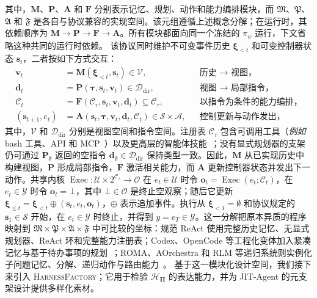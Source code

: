 \documentclass{article}
\newcommand{\ourmethod}{JIT-Agent\xspace}
\begin{document}
其中，$\mathbf{M}$、$\mathbf{P}$、$\mathbf{A}$ 和 $\mathbf{F}$ 分别表示记忆、规划、动作和能力编排模块，而 $\mathfrak{M}$、$\mathfrak{P}$、$\mathfrak{A}$ 和 $\mathfrak{F}$ 是各自与协议兼容的实现空间。该元组遵循上述概念分解；在运行时，其依赖顺序为 $\mathbf{M}\!\rightarrow\!\mathbf{P}\!\rightarrow\!\mathbf{F}\!\rightarrow\!\mathbf{A}$。所有模块都面向同一个冻结的 $\pi_{\psi}$ 运行，下文省略这种共同的运行时依赖。
该协议同时维护不可变事件历史 $\boldsymbol{\xi}_{<t}$ 和可变控制器状态 $\mathbf{s}_t$，二者按如下方式交互：
\begin{equation}
\label{eq:module_dynamics}
\begin{aligned}
    \mathbf{v}_t &= \mathbf{M}(\boldsymbol{\xi}_{<t},\mathbf{s}_t) \in \mathcal{V},
    && \text{历史 $\to$ 视图，} \\
    \mathbf{d}_t &= \mathbf{P}(\boldsymbol{\tau},\mathbf{s}_t,\mathbf{v}_t) \in \mathcal{D}_{\mathrm{dir}},
    && \text{视图 $\to$ 局部指令，} \\
    \mathcal{C}_t &= \mathbf{F}(\mathcal{C}_{\tau},\mathbf{s}_t,\mathbf{v}_t,\mathbf{d}_t) \subseteq \mathcal{C}_{\tau},
    && \text{以指令为条件的能力编排，} \\
    (\mathbf{s}_{t+1},e_t) &= \mathbf{A}(\mathbf{s}_t,\boldsymbol{\tau},\mathbf{v}_t,\mathbf{d}_t,\mathcal{C}_t) \in \mathcal{S}\times\mathcal{A},
    && \text{控制更新与动作发出，}
\end{aligned}
\end{equation}
其中，$\mathcal{V}$ 和 $\mathcal{D}_{\mathrm{dir}}$ 分别是视图空间和指令空间。注册表 $\mathcal{C}_{\tau}$ 包含可调用工具（\textit{例如} bash 工具、API 和 MCP~\citep{sarkar2025surveyllmagentcommunication}）以及更高层的智能体技能~\citep{xu2026agentskillslargelanguage,claudeAgentSkills}；没有显式规划器的支架仍可通过 $\mathbf{P}_{\emptyset}$ 返回的空指令 $\mathbf{d}_{\emptyset}\in\mathcal{D}_{\mathrm{dir}}$ 保持类型一致。因此，$\mathbf{M}$ 从已实现历史中构建视图，$\mathbf{P}$ 形成局部指令，$\mathbf{F}$ 激活相关能力，而 $\mathbf{A}$ 更新控制器状态并发出下一动作。共享内核 $\operatorname{Exec}:\mathcal{U}\times2^{\mathcal{C}_{\tau}}\rightarrow\mathcal{O}$ 在 $e_t\in\mathcal{U}$ 时令 $\mathbf{o}_t=\operatorname{Exec}(e_t;\mathcal{C}_t)$，在 $e_t\in\mathcal{Y}$ 时令 $\mathbf{o}_t=\bot$，其中 $\bot\in\mathcal{O}$ 是终止空观察；随后它更新 $\boldsymbol{\xi}_{\le t}=\boldsymbol{\xi}_{<t}\oplus(\mathbf{s}_t,e_t,\mathbf{o}_t)$，$\oplus$ 表示追加事件。执行从 $\boldsymbol{\xi}_{<1}=\emptyset$ 和协议规定的 $\mathbf{s}_1\in\mathcal{S}$ 开始，在 $e_t\in\mathcal{Y}$ 时终止，并得到 $y=e_T\in\mathcal{Y}$。这一分解把原本异质的程序映射到 $\mathfrak{M}\times\mathfrak{P}\times\mathfrak{A}\times\mathfrak{F}$ 中可比较的坐标：规范 ReAct 使用完整历史记忆、无显式规划器、ReAct 环和完整能力注册表；Codex、OpenCode 等工程化变体加入紧凑记忆与基于待办事项的规划~\citep{openaiCodexCoding,githubGitHubOpencodeaiopencode}；ROMA、AOrchestra 和 RLM 等递归系统则实例化子问题记忆、分解、递归动作与路由能力~\citep{alzubi2026romarecursiveopenmetaagent,ruan2026aorchestraautomatingsubagentcreation,zhang2026recursivelanguagemodels}。
基于这一模块化设计空间，我们接下来引入 \textsc{HarnessFactory}；它用于检验 $\mathcal{H}_{\boldsymbol{\Pi}}$ 的表达能力，并为 \ourmethod 的元支架设计提供多样化素材。
\end{document}
